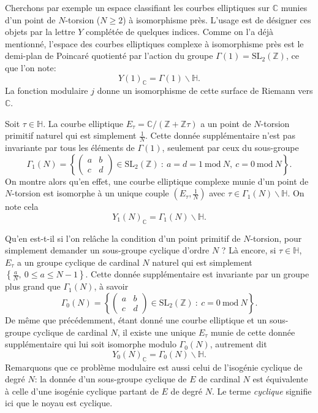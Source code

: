 \documentclass[11pt,a4paper]{article}
\newcommand{\Z}{\mathbb{Z}}
\newcommand{\C}{\mathbb{C}}
\renewcommand{\H}{\mathbb{H}}
\renewcommand{\b}{\backslash}
\renewcommand{\mod}{\ \mathrm{mod}\ }
\theoremstyle{definition}
\begin{document}
Cherchons par exemple un espace classifiant les courbes elliptiques sur $\C$ munies d'un point de $N$-torsion ($N\geq 2$) à isomorphisme près. L'usage est de désigner ces objets par la lettre $Y$ complétée de quelques indices. Comme on l'a déjà mentionné, l'espace des courbes elliptiques complexe à isomorphisme près est le demi-plan de Poincaré quotienté par l'action du groupe $\Gamma(1) = \mathrm{SL}_2(\Z)$, ce que l'on note:
$$Y(1)_\C = \Gamma(1) \b \H.$$
La fonction modulaire $j$ donne un isomorphisme de cette surface de Riemann vers $\C$.

Soit $\tau\in \H$. La courbe elliptique $E_\tau = \C/(\Z+\Z\tau)$ a un point de $N$-torsion primitif naturel qui est simplement $\frac{1}{N}$. Cette donnée supplémentaire n'est pas invariante par tous les éléments de $\Gamma(1)$, seulement par ceux du sous-groupe
$$\Gamma_1(N) = \left\{\left(
\begin{matrix}
a & b \\
c & d
\end{matrix}
\right) \in \mathrm{SL}_2(\Z)\ :\ a = d = 1 \mod{N},\ c = 0\mod{N}\right\}.$$
On montre alors qu'en effet, une courbe elliptique complexe munie d'un point de $N$-torsion est isomorphe à un unique couple $\left(E_\tau, \frac{1}{N}\right)$ avec $\tau\in \Gamma_1(N) \b \H$. On note cela
$$Y_1(N)_\C = \Gamma_1(N) \b \H.$$

Qu'en est-t-il si l'on relâche la condition d'un point primitif de $N$-torsion, pour simplement demander un sous-groupe cyclique d'ordre $N$ ? Là encore, si $\tau\in \H$, $E_\tau$ a un groupe cyclique de cardinal $N$ naturel qui est simplement $\left\{\frac{a}{N},\ 0\leq a\leq N-1\right\}$. Cette donnée supplémentaire est invariante par un groupe plus grand que $\Gamma_1(N)$, à savoir
$$\Gamma_0(N) = \left\{\left(
\begin{matrix}
a & b \\
c & d
\end{matrix}
\right) \in \mathrm{SL}_2(\Z)\ :\ c = 0\mod{N}\right\}.$$
De même que précédemment, étant donné une courbe elliptique et un sous-groupe cyclique de cardinal $N$, il existe une unique $E_\tau$ munie de cette donnée supplémentaire qui lui soit isomorphe modulo $\Gamma_0(N)$, autrement dit
$$Y_0(N)_\C = \Gamma_0(N) \b \H.$$
Remarquons que ce problème modulaire est aussi celui de l'isogénie cyclique de degré $N$: la donnée d'un sous-groupe cyclique de $E$ de cardinal $N$ est équivalente à celle d'une isogénie cyclique partant de $E$ de degré $N$. Le terme \emph{cyclique} signifie ici que le noyau est cyclique.
\end{document}
